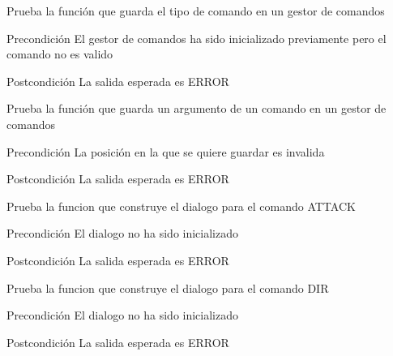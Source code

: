 \begin{DoxyRefList}
\item[\label{test__test000007}%
\hypertarget{test__test000007}{}%
Global \hyperlink{command__test_8c_a6d31d85e0bae80d4b3948a15a5b2b00d}{test2\-\_\-command\-\_\-set\-\_\-cmd} ()]Prueba la función que guarda el tipo de comando en un gestor de comandos \begin{DoxyPrecond}{Precondición}
El gestor de comandos ha sido inicializado previamente pero el comando no es valido 
\end{DoxyPrecond}
\begin{DoxyPostcond}{Postcondición}
La salida esperada es E\-R\-R\-O\-R  
\end{DoxyPostcond}

\item[\label{test__test000010}%
\hypertarget{test__test000010}{}%
Global \hyperlink{command__test_8c_a210152a74338f4aac33cfdc7991e697f}{test2\-\_\-command\-\_\-set\-\_\-cmd\-\_\-arg} ()]Prueba la función que guarda un argumento de un comando en un gestor de comandos \begin{DoxyPrecond}{Precondición}
La posición en la que se quiere guardar es invalida 
\end{DoxyPrecond}
\begin{DoxyPostcond}{Postcondición}
La salida esperada es E\-R\-R\-O\-R  
\end{DoxyPostcond}

\item[\label{test__test000039}%
\hypertarget{test__test000039}{}%
Global \hyperlink{dialogue__test_8c_a98c25f3d225b4d797ea9c719581676d3}{test2\-\_\-dialogue\-\_\-attack} ()]Prueba la funcion que construye el dialogo para el comando A\-T\-T\-A\-C\-K \begin{DoxyPrecond}{Precondición}
El dialogo no ha sido inicializado 
\end{DoxyPrecond}
\begin{DoxyPostcond}{Postcondición}
La salida esperada es E\-R\-R\-O\-R  
\end{DoxyPostcond}

\item[\label{test__test000029}%
\hypertarget{test__test000029}{}%
Global \hyperlink{dialogue__test_8c_a95ef73713203e9a8cc561a3c095f9180}{test2\-\_\-dialogue\-\_\-dir} ()]Prueba la funcion que construye el dialogo para el comando D\-I\-R \begin{DoxyPrecond}{Precondición}
El dialogo no ha sido inicializado 
\end{DoxyPrecond}
\begin{DoxyPostcond}{Postcondición}
La salida esperada es E\-R\-R\-O\-R  
\end{DoxyPostcond}


\end{DoxyRefList}
